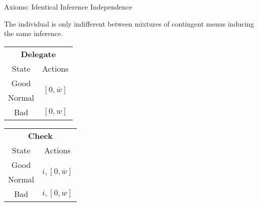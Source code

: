 \documentclass[usenames,dvipsnames,aspectratio=169,11pt, envcountsect, handout]{beamer}
\begin{document}
\begin{frame}{Axioms: Identical Inference Independence}\label{independence}

	\begin{axiom}\label{ax:independence}
		The individual is only indifferent between mixtures of contingent menus inducing the same inference.
	\end{axiom}

	\vfill

	\begin{table}[H]
		\centering
		\begin{minipage}{0.29\textwidth}
			\centering
			\begin{tabular}{c | c}
				\multicolumn{2}{c}{\textbf{Delegate}}                                                     \\
				State                & Actions                                                            \\
				\hline
				{\color{blue}Good}   & \multirow{2}{*}{{\color{blue}\( \left[0, \overline{w} \right] \)}} \\
				{\color{blue}Normal} &                                                                    \\
				Bad                  & \( \left[0, w \right]\)                                            \\
			\end{tabular}
			\vspace{0.5cm} %
		\end{minipage}\hspace{0.5cm} %
		\begin{minipage}{0.29\textwidth}
			\centering
			\begin{tabular}{c | c}
				\multicolumn{2}{c}{\textbf{Check}}                                                            \\
				State                & Actions                                                                \\
				\hline
				{\color{blue}Good}   & \multirow{2}{*}{{\color{blue}\( i, \left[ 0, \overline{w} \right] \)}} \\
				{\color{blue}Normal} &                                                                        \\
				Bad                  & \(  i, \left[0, w \right] \)                                           \\

\end{tabular}
\end{minipage}
\end{table}
\end{frame}
\end{document}

